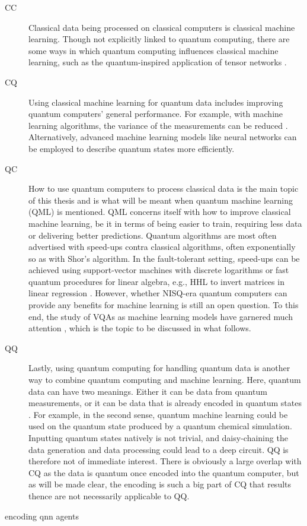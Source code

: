 \begin{description}
    \item[CC]
        Classical data being processed on classical computers is classical machine learning.
        Though not explicitly linked to quantum computing, there are some ways in which quantum computing influences classical machine learning, such as the quantum-inspired application of tensor networks \cite{felser2021}.

    \item[CQ]
        Using classical machine learning for quantum data includes improving quantum computers' general performance.
        For example, with machine learning algorithms, the variance of the measurements can be reduced \cite{torlai2020}.
        Alternatively, advanced machine learning models like neural networks can be employed to describe quantum states more efficiently.


    \item[QC]
        How to use quantum computers to process classical data is the main topic of this thesis and is what will be meant when quantum machine learning (QML) is mentioned.
        QML concerns itself with how to improve classical machine learning, be it in terms of being easier to train, requiring less data or delivering better predictions.
        Quantum algorithms are most often advertised with speed-ups contra classical algorithms, often exponentially so as with Shor's algorithm.
        In the fault-tolerant setting, speed-ups can be achieved using support-vector machines with discrete logarithms \cite{liu2021} or fast quantum procedures for linear algebra, e.g., HHL to invert matrices in linear regression \cite{wiebe2012}.
        However, whether NISQ-era quantum computers can provide any benefits for machine learning is still an open question.
        To this end, the study of VQAs as machine learning models have garnered much attention \cite{benedetti2019}, which is the topic to be discussed in what follows.

    \item[QQ]
        Lastly, using quantum computing for handling quantum data is another way to combine quantum computing and machine learning.
        Here, quantum data can have two meanings.
        Either it can be data from quantum measurements, or it can be data that is already encoded in quantum states \cite{schuld2021a}.
        For example, in the second sense, quantum machine learning could be used on the quantum state produced by a quantum chemical simulation.
        Inputting quantum states natively is not trivial, and daisy-chaining the data generation and data processing could lead to a deep circuit.
        QQ is therefore not of immediate interest.
        There is obviously a large overlap with CQ as the data is quantum once encoded into the quantum computer, but as will be made clear, the encoding is such a big part of CQ that results thence are not necessarily applicable to QQ.

\end{description}



{encoding}
{qnn}
{agents}
